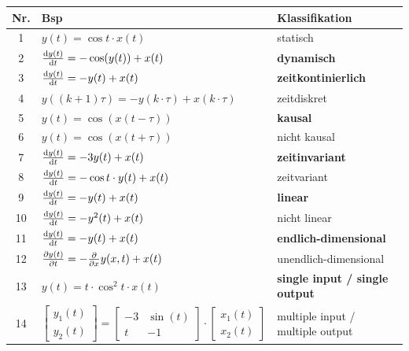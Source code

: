 \begin{tabular}{c|l|l}
 Nr. & Bsp & Klassifikation \\ 
\hline 1 & $y(t) = \cos t \cdot x(t)$ & statisch \\ 
	   2 & $\frac{\mathrm{d} y(t)}{\mathrm{d} t} = - \cos (y(t)) + x(t)$ & \textbf{dynamisch} \\ 
\hline 3 & $\frac{\mathrm{d} y(t)}{\mathrm{d} t} = -y(t) + x(t)$ & \textbf{zeitkontinierlich} \\ 
	   4 & $y((k+1)\tau)=-y(k\cdot \tau) + x(k \cdot \tau)$ & zeitdiskret \\ 
\hline 5 & $y(t) = \cos (x (t-\tau))$ & \textbf{kausal} \\ 
 	   6 & $y(t) = \cos(x(t+\tau))$ & nicht kausal \\ 
\hline 7 & $\frac{\mathrm{d} y(t)}{\mathrm{d} t} = -3y(t) + x(t)$ & \textbf{zeitinvariant} \\ 
	   8 & $\frac{\mathrm{d} y(t)}{\mathrm{d} t} = -\cos t \cdot y(t) +x(t)$ & zeitvariant \\ 
\hline 9 & $\frac{\mathrm{d} y(t)}{\mathrm{d} t} = -y(t) +x(t)$ & \textbf{linear} \\ 
	   10 & $\frac{\mathrm{d} y(t)}{\mathrm{d} t} = -y^2(t) +x(t)$ & nicht linear \\ 
\hline 11 & $\frac{\mathrm{d} y(t)}{\mathrm{d} t} = -y(t) +x(t)$ & \textbf{endlich-dimensional} \\ 
	   12 & $\frac{\partial y(t)}{\partial t} = - \frac{\partial }{\partial x}y(x,t)+x(t)$ & unendlich-dimensional \\ 
\hline 13 & $y(t) = t \cdot \cos^2 t \cdot x(t)$ & \textbf{single input / single output} \\ 
	   14 & $\left[ \begin{matrix} y_1(t) \\ y_2(t) \end{matrix}\right] = \left[ \begin{matrix} -3 & \sin(t) \\ t & -1\end{matrix}\right] \cdot \left[ \begin{matrix} x_1(t)\\ x_2(t) \end{matrix}\right]$ & multiple input / multiple output \\ 
\end{tabular} 